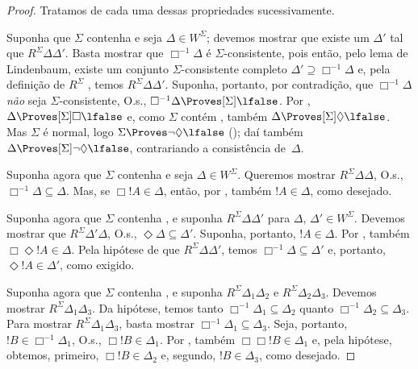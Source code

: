 \documentclass[../../../include/open-logic-section]{subfiles}
\begin{document}
\begin{proof}
  Tratamos de cada uma dessas propriedades sucessivamente.

  Suponha que $\Sigma$ contenha  e seja
  $\Delta \in W^\Sigma$; devemos mostrar que existe um $\Delta'$ tal
  que $R^\Sigma \Delta\Delta'$. Basta mostrar que
  $\Box^{-1}\Delta$ é $\Sigma$-consistente, pois então, pelo lema de
  Lindenbaum, existe um conjunto $\Sigma$-consistente completo
  $\Delta' \supseteq \Box^{-1}\Delta$ e, pela definição de $R^\Sigma$
  , temos
  $R^\Sigma \Delta\Delta'$. Suponha, portanto, por contradição, que
  $\Box^{-1}\Delta$ \emph{não} seja $\Sigma$-consistente, O.s.\@,
  $\Box^{-1}\Delta \Proves[\Sigma] \lfalse$. Por ,
  $\Delta \Proves[\Sigma] \Box\lfalse$ e, como $\Sigma$ contém
  , também $\Delta \Proves[\Sigma] \Diamond\lfalse$. Mas $\Sigma$
  é normal, logo $\Sigma \Proves \lnot\Diamond \lfalse$
  (); daí também $\Delta
  \Proves[\Sigma] \lnot\Diamond \lfalse$, contrariando a consistência
  de~$\Delta$.

  Suponha agora que $\Sigma$ contenha  e seja $\Delta \in
  W^\Sigma$. Queremos mostrar $R^\Sigma \Delta\Delta$, O.s.\@,
  $\Box^{-1}\Delta \subseteq \Delta$. Mas, se $\Box!A \in \Delta$,
  então, por , também $!A \in \Delta$, como desejado.

  Suponha agora que $\Sigma$ contenha , e suponha
  $R^\Sigma \Delta\Delta'$ para $\Delta$, $\Delta' \in W^\Sigma$.
  Devemos mostrar que $R^\Sigma \Delta'\Delta$, O.s.\@,
  $\Diamond\Delta \subseteq \Delta'$. Suponha, portanto,
  $!A \in \Delta$. Por , também $\Box\Diamond!A \in \Delta$.
  Pela hipótese de que $R^\Sigma \Delta\Delta'$, temos $\Box^{-1}\Delta
  \subseteq \Delta'$ e, portanto, $\Diamond!A \in \Delta'$, como exigido.

  Suponha agora que $\Sigma$ contenha , e suponha
  $R^\Sigma \Delta_1\Delta_2$ e $R^\Sigma \Delta_2\Delta_3$. Devemos
  mostrar $R^\Sigma \Delta_1\Delta_3$. Da hipótese, temos tanto
  $\Box^{-1}\Delta_1 \subseteq \Delta_2$ quanto
  $\Box^{-1}\Delta_2 \subseteq \Delta_3$. Para mostrar
  $R^\Sigma \Delta_1\Delta_3$, basta mostrar
  $\Box^{-1}\Delta_1 \subseteq \Delta_3$. Seja, portanto,
  $!B \in \Box^{-1}\Delta_1$, O.s.\@, $\Box!B \in \Delta_1$. Por
  , também $\Box\Box!B \in \Delta_1$ e, pela hipótese, obtemos,
  primeiro, $\Box!B \in \Delta_2$ e, segundo, $!B \in \Delta_3$, como
  desejado.


\end{proof}
\end{document}
